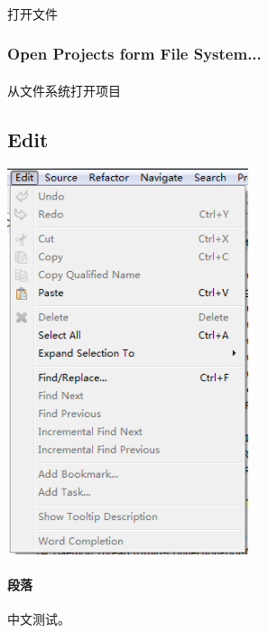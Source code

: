 \documentclass[UTF8]{article}
\begin{document}
              \paragraph{} 打开文件
            \subsubsection{Open Projects form File System...}
              \paragraph{} 从文件系统打开项目
        \subsection{Edit}
            \begin{center} %
              \includegraphics[width=200pt]{images/menu-edit.png} %
            \end{center}
            \paragraph{段落} 中文测试。
\end{document}
